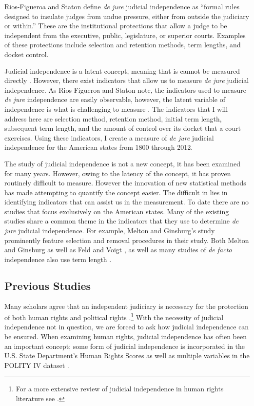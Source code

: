 \documentclass[12pt]{article}
\begin{document}
Rios-Figueroa and Staton \citeyearpar{Rios2014} define \textit{de jure} judicial independence as ``formal rules designed to insulate judges from undue pressure, either from outside the judiciary or within.''  These are the institutional protections that allow a judge to be independent from the executive, public, legislature, or superior courts.  Examples of these protections include selection and retention methods, term lengths, and docket control.

Judicial independence is a latent concept, meaning that is cannot be measured directly \citep[203]{Treier2008}.  However, there exist indicators that allow us to measure \textit{de jure} judicial independence.  As Rios-Figueroa and Staton note, the indicators used to measure \textit{de jure} independence are easily observable, however, the latent variable of independence is what is challenging to measure \citep[5]{Rios2014}.  The indicators that I will address here are selection method, retention method, initial term length, subsequent term length, and the amount of control over its docket that a court exercises.  Using these indicators, I create a measure of \textit{de jure} judicial independence for the American states from 1800 through 2012.

The study of judicial independence is not a new concept, it has been examined for many years.  However, owing to the latency of the concept, it has proven routinely difficult to measure.  However the innovation of new statistical methods has made attempting to quantify the concept easier.  The difficult in lies in identifying indicators that can assist us in the measurement.  To date there are no studies that focus exclusively on the American states.  Many of the existing studies share a common theme in the indicators that they use to determine \textit{de jure} judicial independence.  For example, Melton and Ginsburg's \citeyearpar{Melton2014} study prominently feature selection and removal procedures in their study.  Both Melton and Ginsburg \citeyearpar{Melton2014} as well as Feld and Voigt \citeyearpar{Feld2003}, as well as many studies of \textit{de facto} independence also use term length \citep{Laporta2004, Feld2003, Cingranelli2008, Apodaca2004}. 

\subsection*{Previous Studies} 
Many scholars agree that an independent judiciary is necessary for the protection of both human rights and political rights \citep{Keith2002a,Keith2002b,Howard2004,Russell2001}.\footnote{For a more extensive review of judicial independence in human rights literature see \citep[Footnote 1]{Keith2002b}.}  With the necessity of judicial independence not in question, we are forced to ask how judicial independence can be ensured.  When examining human rights, judicial independence has often been an important concept; some form of judicial independence is incorporated in the U.S. State Department's Human Rights Scores as well as multiple variables in the POLITY IV dataset \citep{Cingranelli2008, Polity,Howard2004}.
\end{document}
